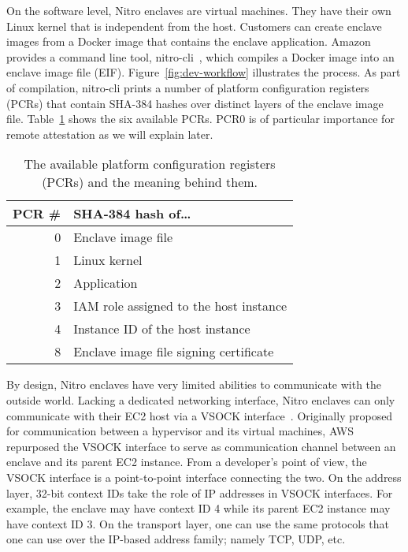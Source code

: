 On the software level, Nitro enclaves are virtual machines.  They have their own
Linux kernel that is independent from the host.  Customers can create enclave
images from a Docker image that contains the enclave application.  Amazon
provides a command line tool, nitro-cli~\cite{nitro-cli}, which compiles a
Docker image into an enclave image file (EIF).  Figure~\ref{fig:dev-workflow}
illustrates the process.  As part of compilation, nitro-cli prints a number of
platform configuration registers (PCRs) that contain SHA-384 hashes over
distinct layers of the enclave image file.  Table~\ref{tab:pcr} shows the six
available PCRs.  PCR0 is of particular importance for remote attestation as we
will explain later.

\begin{table}[t]
    \centering
    \begin{tabular}{r l}
    \toprule
      PCR \# & SHA-384 hash of\ldots \\
    \midrule
      0 & Enclave image file \\
      1 & Linux kernel \\
      2 & Application \\
      3 & IAM role assigned to the host instance \\
      4 & Instance ID of the host instance \\
      8 & Enclave image file signing certificate \\
    \bottomrule
    \end{tabular}
    \caption{The available platform configuration registers (PCRs) and the
    meaning behind them.}\label{tab:pcr}
\end{table}

By design, Nitro enclaves have very limited abilities to communicate with the
outside world.  Lacking a dedicated networking interface, Nitro enclaves can
only communicate with their EC2 host via a VSOCK interface~\cite{vsock}.
Originally proposed for communication between a hypervisor and its virtual
machines, AWS repurposed the VSOCK interface to serve as communication channel
between an enclave and its parent EC2 instance.  From a developer's point of
view, the VSOCK interface is a point-to-point interface connecting the two.  On
the address layer, 32-bit context IDs take the role of IP addresses in VSOCK
interfaces.  For example, the enclave may have context ID 4 while its parent EC2
instance may have context ID 3.  On the transport layer, one can use the same
protocols that one can use over the IP-based address family; namely TCP, UDP,
etc.

